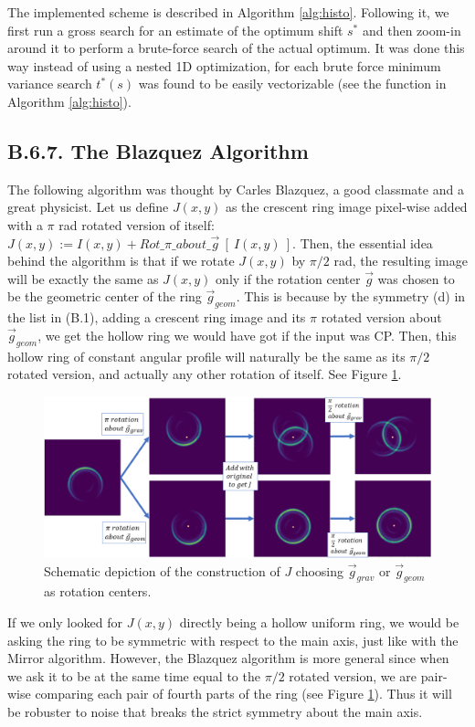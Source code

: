 \documentclass[11pt, a4paper, twoside]{article} %
\begin{document}
The implemented scheme is described in Algorithm \ref{alg:histo}. Following it, we first run a gross search for an estimate of the optimum shift $s^*$ and then zoom-in around it to perform a brute-force search of the actual optimum. It was done this way instead of using a nested 1D optimization, for each brute force minimum variance search $t^*(s)$ was found to be easily vectorizable (see the function in Algorithm \ref{alg:histo}).\vspace{-0.25cm}

\subsection*{B.6.7. The Blazquez Algorithm}\vspace{-0.15cm}
The following algorithm was thought by Carles Blazquez, a good classmate and a great physicist. Let us define $J(x,y)$ as the crescent ring image pixel-wise added with a $\pi$ rad rotated version of itself: $J(x,y):=I(x,y)+Rot\_\pi\_about\_\vec{g}\ [\ I(x,y)\ ]$. Then, the essential idea behind the algorithm is that if we rotate $J(x,y)$ by $\pi/2$ rad, the resulting image will be exactly the same as $J(x,y)$ only if the rotation center $\vec{g}$ was chosen to be the geometric center of the ring $\vec{g}_{geom}$. This is because by the symmetry (d) in the list in (B.1), adding a crescent ring image and its $\pi$ rotated version about $\vec{g}_{geom}$, we get the hollow ring we would have got if the input was CP. Then, this hollow ring of constant angular profile will naturally be the same as its $\pi/2$ rotated version, and actually any other rotation of itself. See Figure \ref{fig:blaz}.\vspace{-0.3cm}

\begin{figure}[h!] 
     \centering 
    \includegraphics[width=0.85\linewidth]{blaz.PNG}
    \caption{ Schematic depiction of the construction of $J$ choosing $\vec{g}_{grav}$ or $\vec{g}_{geom}$ as rotation centers. }
    \label{fig:blaz}
\end{figure}
If we only looked for $J(x,y)$ directly being a hollow uniform ring, we would be asking the ring to be symmetric with respect to the main axis, just like with the Mirror algorithm. However, the Blazquez algorithm is more general since when we ask it to be at the same time equal to the $\pi/2$ rotated version, we are pair-wise comparing each pair of fourth parts of the ring (see Figure \ref{fig:blaz}). Thus it will be robuster to noise that breaks the strict symmetry about the main axis.
\end{document}
